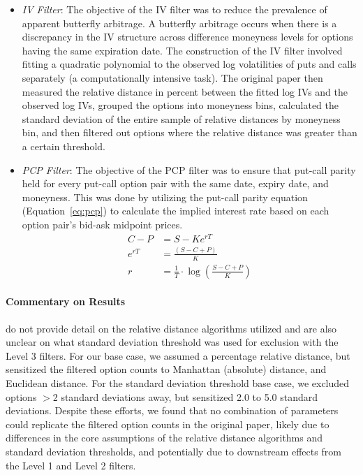 \begin{itemize}
  \item \textit{IV Filter}: The objective of the IV filter was to reduce the prevalence of apparent butterfly arbitrage. A butterfly arbitrage occurs when there is a discrepancy in the IV structure across difference moneyness levels for options having the same expiration date. The construction of the IV filter involved fitting a quadratic polynomial to the observed log volatilities of puts and calls separately (a computationally intensive task). The original paper then measured the relative distance in percent between the fitted log IVs and the observed log IVs, grouped the options into moneyness bins, calculated the standard deviation of the entire sample of relative distances by moneyness bin, and then filtered out options where the relative distance was greater than a certain threshold.
  \item \textit{PCP Filter}: The objective of the PCP filter was to ensure that put-call parity held for every put-call option pair with the same date, expiry date, and moneyness. This was done by utilizing the put-call parity equation (Equation~\ref{eq:pcp}) to calculate the implied interest rate based on each option pair's bid-ask midpoint prices.
\begin{align}
  \label{eq:pcp}
  C-P &= S-Ke^{rT} \\
  e^{rT} &= \frac{(S-C+P)}{K} \\
  r &= \frac{1}{T} \cdot \log\left(\frac{S-C+P}{K}\right)
\end{align}
\end{itemize}


\paragraph{Commentary on Results}
\citet{constantinides2013} do not provide detail on the relative distance algorithms utilized and are also unclear on what standard deviation threshold was used for exclusion with the Level 3 filters. For our base case, we assumed a percentage relative distance, but sensitized the filtered option counts to Manhattan (absolute) distance, and Euclidean distance. For the standard deviation threshold base case, we excluded options $>$2 standard deviations away, but sensitized 2.0 to 5.0 standard deviations. Despite these efforts, we found that no combination of parameters could replicate the filtered option counts in the original paper, likely due to differences in the core assumptions of the relative distance algorithms and standard deviation thresholds, and potentially due to downstream effects from the Level 1 and Level 2 filters. 


